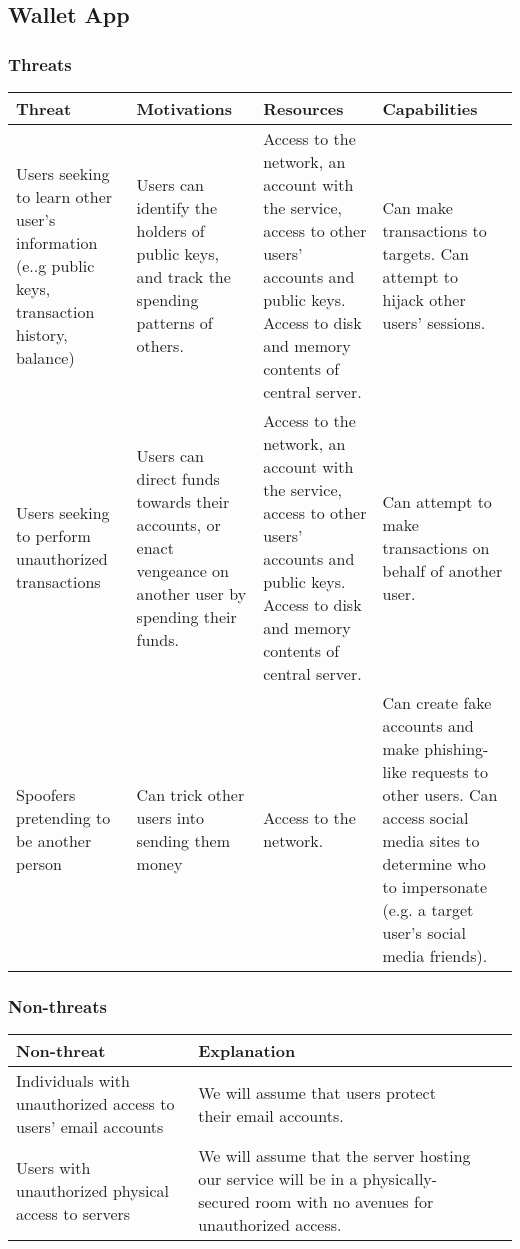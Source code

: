 \documentclass[12pt]{article}
\begin{document}
\subsection{Wallet App}

\subsubsection*{Threats}

\begin{tabulary}{\linewidth}{|L|L|L|L|}
\hline
\textbf{Threat} & \textbf{Motivations} & \textbf{Resources} & \textbf{Capabilities} \\
\hline
Users seeking to learn other user's information (e..g public keys, transaction history, balance) & Users can identify the holders of public keys, and track the spending patterns of others. & Access to the network, an account with the service, access to other users' accounts and public keys. Access to disk and memory contents of central server. & Can make transactions to targets. Can attempt to hijack other users' sessions. \\
\hline
Users seeking to perform unauthorized transactions & Users can direct funds towards their accounts, or enact vengeance on another user by spending their funds. & Access to the network, an account with the service, access to other users' accounts and public keys. Access to disk and memory contents of central server. & Can attempt to make transactions on behalf of another user. \\
\hline
Spoofers pretending to be another person & Can trick other users into sending them money & Access to the network. & Can create fake accounts and make phishing-like requests to other users. Can access social media sites to determine who to impersonate (e.g. a target user's social media friends). \\
\hline
\end{tabulary}

\subsubsection*{Non-threats}

\begin{tabulary}{\linewidth}{|L|L|L|L|}
\hline
\textbf{Non-threat} & \textbf{Explanation} \\
\hline
Individuals with unauthorized access to users' email accounts & We will assume that users protect their email accounts.
\\ \hline
Users with unauthorized physical access to servers & We will assume that the server hosting our service will be in a physically-secured room with no avenues for unauthorized access.
\\ \hline
\end{tabulary}
\end{document}
